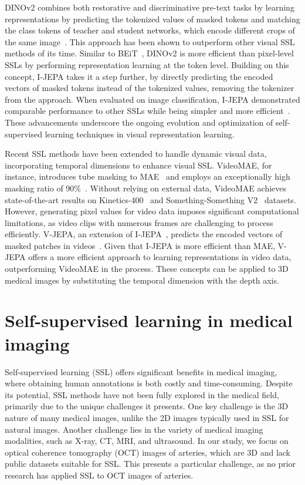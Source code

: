 \documentclass[a4paper,11pt,oneside]{report}
\begin{document}
DINOv2 combines both restorative and discriminative pre-text tasks by learning representations by predicting the tokenized values of masked tokens and matching the class tokens of teacher and student networks, which encode different crops of the same image~\cite{Oquab2024dinov}. This approach has been shown to outperform other visual SSL methods of its time. Similar to BEiT~\cite{Bao2022beit}, DINOv2 is more efficient than pixel-level SSLs by performing representation learning at the token level. Building on this concept, I-JEPA takes it a step further, by directly predicting the encoded vectors of masked tokens instead of the tokenized values, removing the tokenizer from the approach. When evaluated on image classification, I-JEPA demonstrated comparable performance to other SSLs while being simpler and more efficient~\cite{Assran2023}. These advancements underscore the ongoing evolution and optimization of self-supervised learning techniques in visual representation learning.

Recent SSL methods have been extended to handle dynamic visual data, incorporating temporal dimensions to enhance visual SSL. VideoMAE, for instance, introduces tube masking to MAE~\cite{He2022} and employs an exceptionally high masking ratio of 90\%~\cite{Tong2022VideoMAE}. Without relying on external data, VideoMAE achieves state-of-the-art results on Kinetics-400~\cite{Kay2017Kinetics} and Something-Something V2~\cite{Goyal2017Something-SomethingV2} datasets. However, generating pixel values for video data imposes significant computational limitations, as video clips with numerous frames are challenging to process efficiently. V-JEPA, an extension of I-JEPA~\cite{Assran2023}, predicts the encoded vectors of masked patches in videos~\cite{Bardes2024Vjepa}. Given that I-JEPA is more efficient than MAE, V-JEPA offers a more efficient approach to learning representations in video data, outperforming VideoMAE in the process. These concepts can be applied to 3D medical images by substituting the temporal dimension with the depth axis.

\section{Self-supervised learning in medical imaging}
Self-supervised learning (SSL) offers significant benefits in medical imaging, where obtaining human annotations is both costly and time-consuming. Despite its potential, SSL methods have not been fully explored in the medical field, primarily due to the unique challenges it presents. One key challenge is the 3D nature of many medical images, unlike the 2D images typically used in SSL for natural images. Another challenge lies in the variety of medical imaging modalities, such as X-ray, CT, MRI, and ultrasound. In our study, we focus on optical coherence tomography (OCT) images of arteries, which are 3D and lack public datasets suitable for SSL. This presents a particular challenge, as no prior research has applied SSL to OCT images of arteries.
\end{document}

